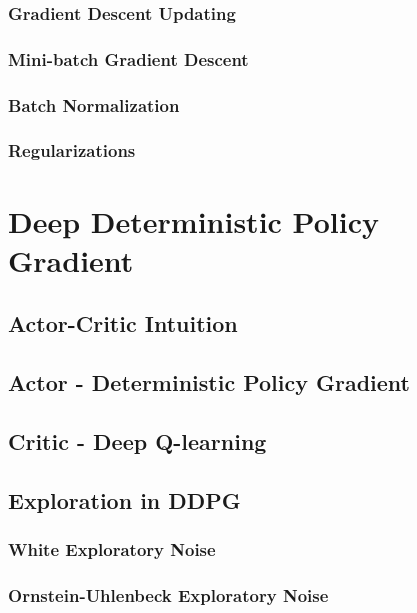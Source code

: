\subsubsection{Gradient Descent Updating}
\subsubsection{Mini-batch Gradient Descent}
\subsubsection{Batch Normalization}
\subsubsection{Regularizations}




\section{Deep Deterministic Policy Gradient}
\subsection{Actor-Critic Intuition}
\subsection{Actor - Deterministic Policy Gradient}
\subsection{Critic - Deep Q-learning}

\newpage

\subsection{Exploration in DDPG}
\subsubsection{White Exploratory Noise}
\subsubsection{Ornstein-Uhlenbeck Exploratory Noise}
